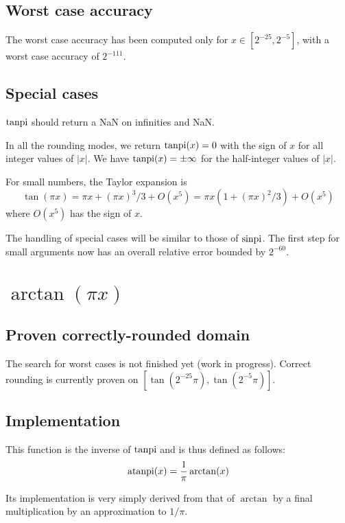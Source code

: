 \subsection{Worst case accuracy}

The worst case accuracy has been computed only for $x \in [2^{-25},
2^{-5}]$, with a worst case accuracy of $2^{-111}$. 

\subsection{Special cases}


$\operatorname{tanpi}$ should return a NaN on infinities and NaN.

In all the rounding modes, we return $\operatorname{tanpi}(x)=0$ with the sign of $x$ for all
integer values of $|x|$. We have $\operatorname{tanpi}(x)=\pm \infty$ for  the half-integer
values of $|x|$. 

For small numbers, the Taylor expansion is
\begin{equation}
  \tan(\pi x) = \pi x + (\pi x)^3/3 + O(x^5) 
  = \pi x(1+(\pi x)^2/3) + O(x^5)\label{eq:tanpiTaylor}
\end{equation}
where $O(x^5)$ has the sign of $x$. 

The handling of special cases will be similar to those of $\operatorname{sinpi}$. The
first step for small arguments now has an overall relative error
bounded by $2^{-60}$.
 

\section{ $\arctan(\pi x)$}

\subsection{Proven correctly-rounded domain}

The search for worst cases is not finished yet (work in progress).
Correct rounding is currently proven on $[\tan(2^{-25}\pi),
\tan(2^{-5}\pi)]$.

\subsection{Implementation}
This function is the inverse of $\operatorname{tanpi}$ and is thus defined as follows:
$$\operatorname{atanpi}(x) = \frac{1}{\pi}\arctan(x)$$

Its implementation is very simply derived from that of $\arctan$ by a
final multiplication by an approximation to $1/\pi$. 

